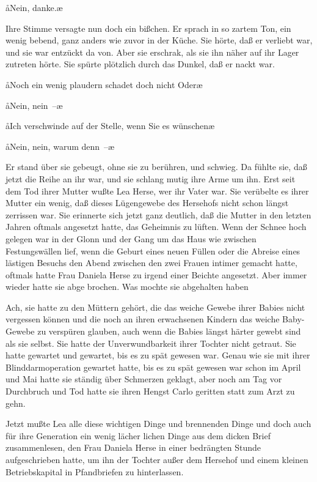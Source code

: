 \aa Nein, danke.\ae

Ihre Stimme versagte nun doch ein bißchen. Er sprach in so
zartem Ton, ein wenig bebend, ganz anders wie zuvor in der
Küche. Sie hörte, daß er verliebt war, und sie war entzückt da\-%
von. Aber sie erschrak, als sie ihn näher auf ihr Lager zutreten
hörte. Sie spürte plötzlich durch das Dunkel, daß er nackt war.

\aa Noch ein wenig plaudern schadet doch nicht\frag{} Oder\frag\ae

\aa Nein, nein~--\ae

\aa Ich verschwinde auf der Stelle, wenn Sie es wünschen\frag\ae

\aa Nein, nein, warum denn~--\ae

Er stand über sie gebeugt, ohne sie zu berühren, und schwieg.
Da fühlte sie, daß jetzt die Reihe an ihr war, und sie schlang
mutig ihre Arme um ihn.
\abstand
Erst seit dem Tod ihrer Mutter wußte Lea Herse, wer ihr
Vater war. Sie verübelte es ihrer Mutter ein wenig, daß
dieses Lügengewebe des Hersehofs nicht schon längst zerrissen
war. Sie erinnerte sich jetzt ganz deutlich, daß die Mutter in
den letzten Jahren oftmals angesetzt hatte, das Geheimnis zu
lüften. Wenn der Schnee hoch gelegen war in der Glonn und
der Gang um das Haus wie zwischen Festungswällen lief,
wenn die Geburt eines neuen Füllen oder die Abreise eines
lästigen Besuchs den Abend zwischen den zwei Frauen intimer
gemacht hatte, oftmals hatte Frau Daniela Herse zu irgend
einer Beichte angesetzt. Aber immer wieder hatte sie abge\-%
brochen. Was mochte sie abgehalten haben\frag

Ach, sie hatte zu den Müttern gehört, die das weiche Gewebe
ihrer Babies nicht vergessen können und die noch an ihren
erwachsenen Kindern das weiche Baby-Gewebe zu verspüren
glauben, auch wenn die Babies längst härter gewebt sind als
sie selbst. Sie hatte der Unverwundbarkeit ihrer Tochter nicht
getraut. Sie hatte gewartet und gewartet, bis es zu spät
gewesen war. Genau wie sie mit ihrer Blinddarmoperation
gewartet hatte, bis es zu spät gewesen war\dopp{} schon im April
und Mai hatte sie ständig über Schmerzen geklagt, aber noch
am Tag vor Durchbruch und Tod hatte sie ihren Hengst Carlo
geritten statt zum Arzt zu gehn.

Jetzt mußte Lea alle diese wichtigen Dinge und brennenden
Dinge und doch auch für ihre Generation ein wenig lächer\-%
lichen Dinge aus dem dicken Brief zusammenlesen, den Frau
Daniela Herse in einer bedrängten Stunde aufgeschrieben
hatte, um ihn der Tochter außer dem Hersehof und einem
kleinen Betriebskapital in Pfandbriefen zu hinterlassen.

